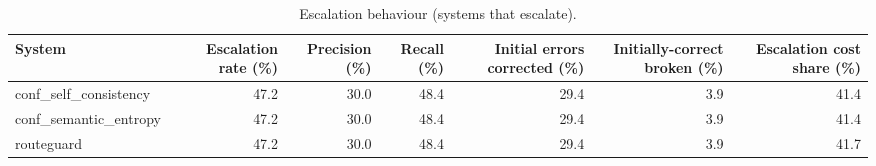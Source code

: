 \begin{table}[t]
\centering
\small
\caption{Escalation behaviour (systems that escalate).}
\label{tab:escalation}
\begin{tabular}{lrrrrrr}
\toprule
System & Escalation rate (\%) & Precision (\%) & Recall (\%) & Initial errors corrected (\%) & Initially-correct broken (\%) & Escalation cost share (\%) \\
\midrule
conf\_self\_consistency & 47.2 & 30.0 & 48.4 & 29.4 & 3.9 & 41.4 \\
conf\_semantic\_entropy & 47.2 & 30.0 & 48.4 & 29.4 & 3.9 & 41.4 \\
routeguard & 47.2 & 30.0 & 48.4 & 29.4 & 3.9 & 41.7 \\
\bottomrule
\end{tabular}
\end{table}
